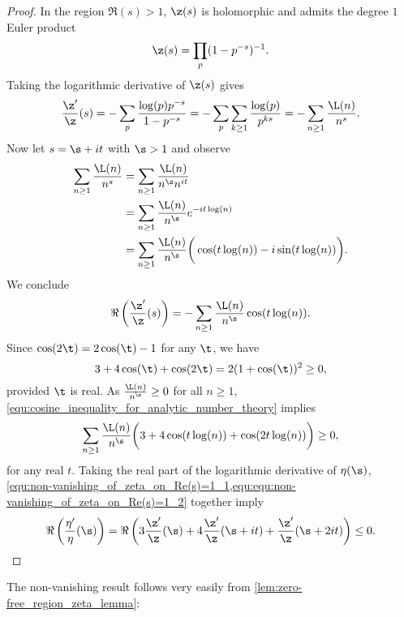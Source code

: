       \begin{proof}
        In the region $\Re(s) > 1$, $\z(s)$ is holomorphic and admits the degree $1$ Euler product
        \[
          \z(s) = \prod_{p}(1-p^{-s})^{-1}.
        \]
        Taking the logarithmic derivative of $\z(s)$ gives
        \begin{equation}\label{equ:Drichlet_series_log_derivative_zeta}
          \frac{\z'}{\z}(s) = -\sum_{p}\frac{\log(p)p^{-s}}{1-p^{-s}} = -\sum_{p}\sum_{k \ge 1}\frac{\log(p)}{p^{ks}} = -\sum_{n \ge 1}\frac{\L(n)}{n^{s}}.
        \end{equation}
        Now let $s = \s+it$ with $\s > 1$ and observe
        \begin{align*}
          \sum_{n \ge 1}\frac{\L(n)}{n^{s}} &= \sum_{n \ge 1}\frac{\L(n)}{n^{\s}n^{it}} \\
          &= \sum_{n \ge 1}\frac{\L(n)}{n^{\s}}e^{-it\log(n)} \\
          &= \sum_{n \ge 1}\frac{\L(n)}{n^{\s}}\bigg(\cos(t\log(n))-i\sin(t\log(n))\bigg).
        \end{align*}
        We conclude
        \begin{equation}\label{equ:non-vanishing_of_zeta_on_Re(s)=1_1}
          \Re\left(\frac{\z'}{\z}(s)\right) = -\sum_{n \ge 1}\frac{\L(n)}{n^{\s}}\cos(t\log(n)).
        \end{equation}
        Since $\cos(2\t) = 2\cos(\t)-1$ for any $\t$, we have
        \begin{equation}\label{equ:cosine_inequality_for_analytic_number_theory}
          3+4\cos(\t)+\cos(2\t) = 2(1+\cos(\t))^{2} \ge 0,
        \end{equation}
        provided $\t$ is real. As $\frac{\L(n)}{n^{\s}} \ge 0$ for all $n \ge 1$, \cref{equ:cosine_inequality_for_analytic_number_theory} implies
        \begin{equation}\label{equ:equ:non-vanishing_of_zeta_on_Re(s)=1_2}
          \sum_{n \ge 1}\frac{\L(n)}{n^{\s}}\bigg(3+4\cos(t\log(n))+\cos(2t\log(n))\bigg) \ge 0,
        \end{equation}
        for any real $t$. Taking the real part of the logarithmic derivative of $\eta(\s)$, \cref{equ:non-vanishing_of_zeta_on_Re(s)=1_1,equ:equ:non-vanishing_of_zeta_on_Re(s)=1_2} together imply
        \[
           \Re\left(\frac{\eta'}{\eta}(\s)\right) = \Re\left(3\frac{\z'}{\z}(\s)+4\frac{\z'}{\z}(\s+it)+\frac{\z'}{\z}(\s+2it)\right) \le 0.
        \]
      \end{proof}

      The non-vanishing result follows very easily from \cref{lem:zero-free_region_zeta_lemma}:

